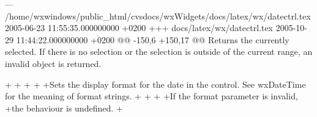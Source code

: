 --- /home/wxwindows/public_html/cvsdocs/wxWidgets/docs/latex/wx/datectrl.tex	2005-06-23 11:55:35.000000000 +0200
+++ docs/latex/wx/datectrl.tex	2005-10-29 11:44:22.000000000 +0200
@@ -150,6 +150,17 @@
 Returns the currently selected. If there is no selection or the selection is
 outside of the current range, an invalid object is returned.
 
+\label{wxdatepickerctrlsetformat}
+
+
+
+Sets the display format for the date in the control. See wxDateTime for the meaning of format strings.
+
+
+
+If the format parameter is invalid,
+the behaviour is undefined.
+
 
 \label{wxdatepickerctrlsetrange}

 	  	 
